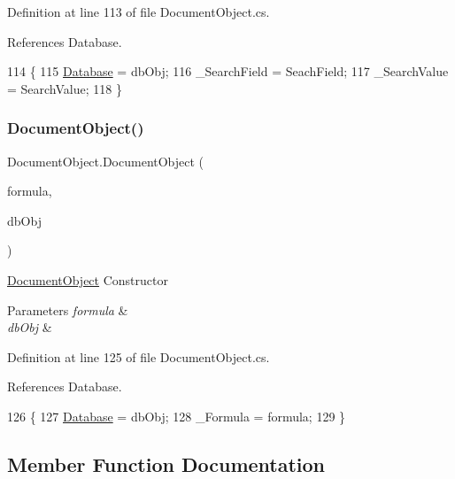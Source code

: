 Definition at line 113 of file Document\+Object.\+cs.



References Database.


\begin{DoxyCode}
114     \{
115         \mbox{\hyperlink{class_document_object_a69d5338c9835f748490323d2950eed09}{Database}} = dbObj;
116         \_SearchField = SeachField;
117         \_SearchValue = SearchValue;
118     \}
\end{DoxyCode}
\mbox{\label{class_document_object_a4eb6c7aaa4774d1d5dbf5bf17dff23d9}} 
\subsubsection{\texorpdfstring{Document\+Object()}{DocumentObject()}\hspace{0.1cm}{\footnotesize\ttfamily [3/3]}}
{\footnotesize\ttfamily Document\+Object.\+Document\+Object (\begin{DoxyParamCaption}\item[{string}]{formula,  }\item[{\mbox{\hyperlink{class_database_object}{Database\+Object}}}]{db\+Obj }\end{DoxyParamCaption})}



\mbox{\hyperlink{class_document_object}{Document\+Object}} Constructor 


\begin{DoxyParams}{Parameters}
{\em formula} & \\
\hline
{\em db\+Obj} & \\
\hline
\end{DoxyParams}


Definition at line 125 of file Document\+Object.\+cs.



References Database.


\begin{DoxyCode}
126     \{
127         \mbox{\hyperlink{class_document_object_a69d5338c9835f748490323d2950eed09}{Database}} = dbObj;
128         \_Formula = formula;
129     \}
\end{DoxyCode}


\subsection{Member Function Documentation}
\mbox{\label{class_document_object_a28ab6562c34b5cf44ce7ab738d1730e1}} 
